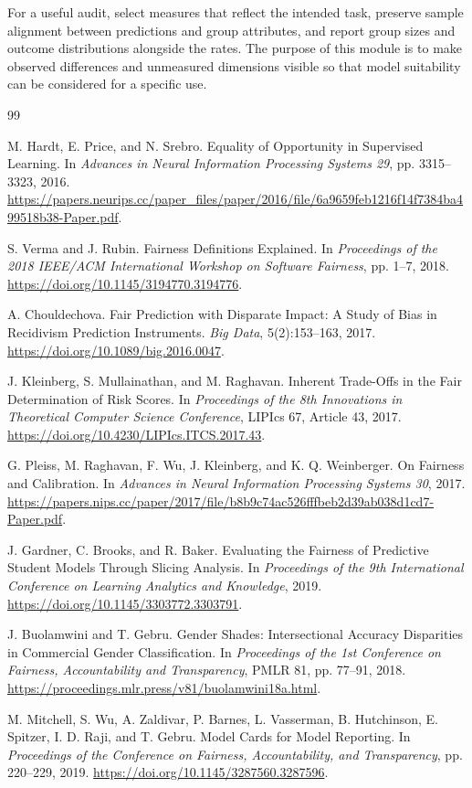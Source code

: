 \documentclass[12pt,a4paper]{article}
\begin{document}
For a useful audit, select measures that reflect the intended task, preserve sample alignment between predictions and group attributes, and report group sizes and outcome distributions alongside the rates. The purpose of this module is to make observed differences and unmeasured dimensions visible so that model suitability can be considered for a specific use.

\begin{thebibliography}{99}

M. Hardt, E. Price, and N. Srebro.
\newblock Equality of Opportunity in Supervised Learning.
\newblock In \emph{Advances in Neural Information Processing Systems 29}, pp. 3315--3323, 2016.
\newblock \url{https://papers.neurips.cc/paper_files/paper/2016/file/6a9659feb1216f14f7384ba499518b38-Paper.pdf}.

S. Verma and J. Rubin.
\newblock Fairness Definitions Explained.
\newblock In \emph{Proceedings of the 2018 IEEE/ACM International Workshop on Software Fairness}, pp. 1--7, 2018.
\newblock \url{https://doi.org/10.1145/3194770.3194776}.

A. Chouldechova.
\newblock Fair Prediction with Disparate Impact: A Study of Bias in Recidivism Prediction Instruments.
\newblock \emph{Big Data}, 5(2):153--163, 2017.
\newblock \url{https://doi.org/10.1089/big.2016.0047}.

J. Kleinberg, S. Mullainathan, and M. Raghavan.
\newblock Inherent Trade-Offs in the Fair Determination of Risk Scores.
\newblock In \emph{Proceedings of the 8th Innovations in Theoretical Computer Science Conference}, LIPIcs 67, Article 43, 2017.
\newblock \url{https://doi.org/10.4230/LIPIcs.ITCS.2017.43}.

G. Pleiss, M. Raghavan, F. Wu, J. Kleinberg, and K. Q. Weinberger.
\newblock On Fairness and Calibration.
\newblock In \emph{Advances in Neural Information Processing Systems 30}, 2017.
\newblock \url{https://papers.nips.cc/paper/2017/file/b8b9c74ac526fffbeb2d39ab038d1cd7-Paper.pdf}.

J. Gardner, C. Brooks, and R. Baker.
\newblock Evaluating the Fairness of Predictive Student Models Through Slicing Analysis.
\newblock In \emph{Proceedings of the 9th International Conference on Learning Analytics and Knowledge}, 2019.
\newblock \url{https://doi.org/10.1145/3303772.3303791}.

J. Buolamwini and T. Gebru.
\newblock Gender Shades: Intersectional Accuracy Disparities in Commercial Gender Classification.
\newblock In \emph{Proceedings of the 1st Conference on Fairness, Accountability and Transparency}, PMLR 81, pp. 77--91, 2018.
\newblock \url{https://proceedings.mlr.press/v81/buolamwini18a.html}.

M. Mitchell, S. Wu, A. Zaldivar, P. Barnes, L. Vasserman, B. Hutchinson, E. Spitzer, I. D. Raji, and T. Gebru.
\newblock Model Cards for Model Reporting.
\newblock In \emph{Proceedings of the Conference on Fairness, Accountability, and Transparency}, pp. 220--229, 2019.
\newblock \url{https://doi.org/10.1145/3287560.3287596}.

\end{thebibliography}
\end{document}
